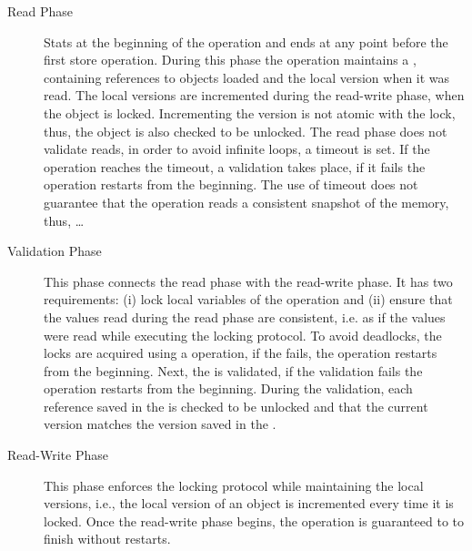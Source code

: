 \begin{description}
  \item[Read Phase] Stats at the beginning of the operation and
  ends at any point before the first store operation. 
  During this phase the operation maintains a \readSet, 
  containing references to objects loaded and the local 
  version when it was read. The local versions are incremented 
  during the read-write phase, when the object is locked. 
  Incrementing the version is not atomic with the lock, thus, 
  the object is also checked to be unlocked. 
  The read phase does not validate reads, 
  in order to avoid infinite loops, a timeout is set. 
  If the operation reaches the timeout, 
  a \readSet validation takes place, if it fails 
  the operation restarts from the beginning.
  The use of timeout does not guarantee that the 
  operation reads a consistent snapshot of the memory, 
  thus, \ldots 
  
  \item[Validation Phase] This phase connects the read phase
  with the read-write phase. It has two requirements: (i) lock 
  local variables of the operation and (ii) ensure that the 
  values read during the read phase are consistent, i.e.
  as if the values were read while executing the locking 
  protocol. To avoid deadlocks, the locks are acquired using 
  a  operation, if the  fails, 
  the operation restarts from the beginning. Next, the \readSet 
  is validated, if the validation fails the operation restarts from the
  beginning. During the \readSet validation, each reference saved 
  in the \readSet is checked to be unlocked and that the current 
  version matches the version saved in the \readSet. 
  
  \item[Read-Write Phase] This phase enforces the locking protocol
  while maintaining the local versions, i.e., the local version of 
  an object is incremented every time it is locked.  
  Once the read-write phase begins, the operation is guaranteed to to 
  finish without restarts.  
\end{description}


 
